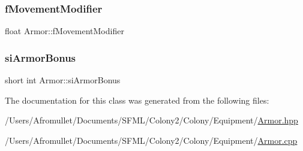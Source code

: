 \mbox{\label{class_armor_aa71e430d9308cfe64b5168014c063722}} 
\subsubsection{\texorpdfstring{f\+Movement\+Modifier}{fMovementModifier}}
{\footnotesize\ttfamily float Armor\+::f\+Movement\+Modifier\hspace{0.3cm}{\ttfamily [private]}}

\mbox{\label{class_armor_a2ebccb72313c650ec1b8bafec4e82dc2}} 
\subsubsection{\texorpdfstring{si\+Armor\+Bonus}{siArmorBonus}}
{\footnotesize\ttfamily short int Armor\+::si\+Armor\+Bonus\hspace{0.3cm}{\ttfamily [private]}}



The documentation for this class was generated from the following files\+:\begin{DoxyCompactItemize}
\item 
/\+Users/\+Afromullet/\+Documents/\+S\+F\+M\+L/\+Colony2/\+Colony/\+Equipment/\mbox{\hyperlink{_armor_8hpp}{Armor.\+hpp}}\item 
/\+Users/\+Afromullet/\+Documents/\+S\+F\+M\+L/\+Colony2/\+Colony/\+Equipment/\mbox{\hyperlink{_armor_8cpp}{Armor.\+cpp}}\end{DoxyCompactItemize}
